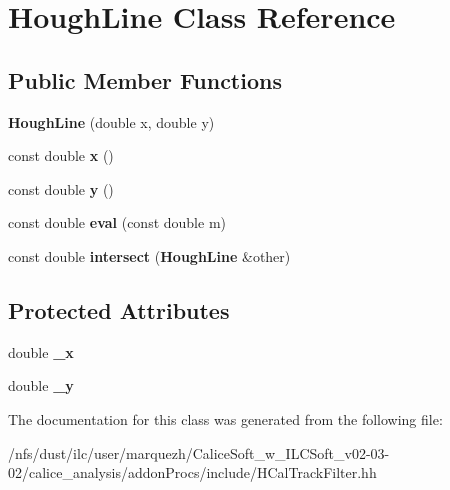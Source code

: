 \section{Hough\-Line Class Reference}
\label{classHoughLine}
\subsection*{Public Member Functions}
\begin{DoxyCompactItemize}
\item 
{\bfseries Hough\-Line} (double x, double y)\label{classHoughLine_a8538fc21681611ac8dc6f5ce7a60b6a2}

\item 
const double {\bfseries x} ()\label{classHoughLine_a48f5ce5de0a449974f246a2172775953}

\item 
const double {\bfseries y} ()\label{classHoughLine_a75e32a8179ed07c78f24d4cb5f207efa}

\item 
const double {\bfseries eval} (const double m)\label{classHoughLine_a5e569bc2a9e78e27ab3210102f727a30}

\item 
const double {\bfseries intersect} ({\bf Hough\-Line} \&other)\label{classHoughLine_a206059bec31296b8e0c29140f1c3ddc9}

\end{DoxyCompactItemize}
\subsection*{Protected Attributes}
\begin{DoxyCompactItemize}
\item 
double {\bfseries \-\_\-x}\label{classHoughLine_a215432f5c9ff93ed9ffd97acd93db706}

\item 
double {\bfseries \-\_\-y}\label{classHoughLine_a5a4371e71251685b9dae2a74ca971757}

\end{DoxyCompactItemize}


The documentation for this class was generated from the following file\-:\begin{DoxyCompactItemize}
\item 
/nfs/dust/ilc/user/marquezh/\-Calice\-Soft\-\_\-w\-\_\-\-I\-L\-C\-Soft\-\_\-v02-\/03-\/02/calice\-\_\-analysis/addon\-Procs/include/H\-Cal\-Track\-Filter.\-hh\end{DoxyCompactItemize}
